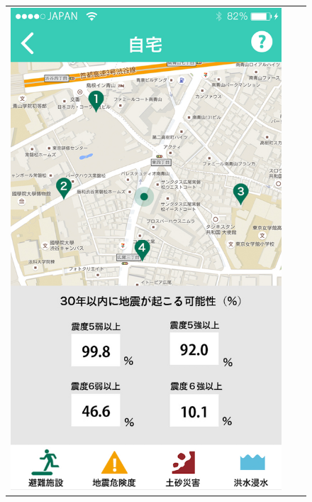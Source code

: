 \documentclass[a4paper]{jsarticle}
\begin{document}
\fifigure
\begin{figure}[H]
  \begin{center}
    \begin{tabular}{ccc}
    \begin{minipage}{0.3\hsize}
	\includegraphics[width=\hsize]{./images/mbs_eq.jpg}
    \end{minipage}
    &
    \begin{minipage}{0.3\hsize}

\end{minipage}
\end{tabular}
\end{center}
\end{figure}
\end{document}
